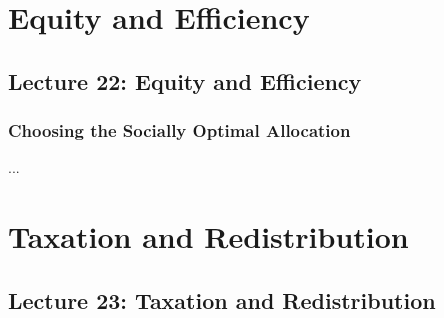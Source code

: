 \documentclass{article}
\begin{document}
\section{Equity and Efficiency}
\subsection{Lecture 22: Equity and Efficiency}
\subsubsection{Choosing the Socially Optimal Allocation}
...

\section{Taxation and Redistribution}
\subsection{Lecture 23: Taxation and Redistribution}
\end{document}
